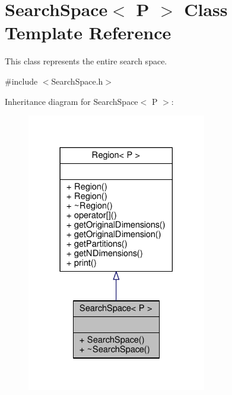 \hypertarget{classSearchSpace}{}\section{Search\+Space$<$ P $>$ Class Template Reference}
\label{classSearchSpace}


This class represents the entire search space.  




{\ttfamily \#include $<$Search\+Space.\+h$>$}



Inheritance diagram for Search\+Space$<$ P $>$\+:\nopagebreak
\begin{figure}[H]
\begin{center}
\leavevmode
\includegraphics[width=222pt]{classSearchSpace__inherit__graph}
\end{center}
\end{figure}


